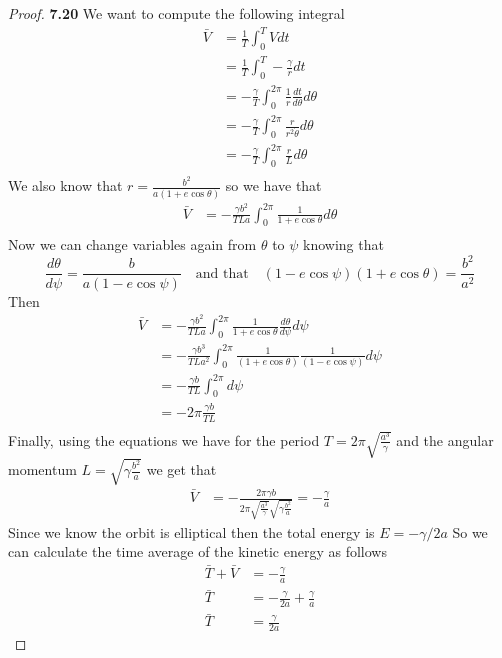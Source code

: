 \documentclass[11pt]{article}
\theoremstyle{definition}
\begin{document}
	\begin{proof}{\textbf{7.20}}
        We want to compute the following integral
        \begin{align*}
            \bar{V} &= \frac{1}{T}\int_0^T Vdt\\
                &= \frac{1}{T}\int_0^T -\frac{\gamma}{r}dt\\
                &= -\frac{\gamma}{T}\int_0^{2\pi} \frac{1}{r}\frac{dt}{d\theta}d\theta\\
                &= -\frac{\gamma}{T}\int_0^{2\pi} \frac{r}{r^2\dot{\theta}}d\theta\\
                &= -\frac{\gamma}{T}\int_0^{2\pi} \frac{r}{L}d\theta\\
        \end{align*}
        We also know that $r = \frac{b^2}{a(1+e\cos\theta)}$ so we have that
        \begin{align*}
            \bar{V} &= -\frac{\gamma b^2}{TLa}\int_0^{2\pi} \frac{1}{1 + e\cos\theta}d\theta\\
        \end{align*}
        Now we can change variables again from $\theta$ to $\psi$ knowing that
        $$\frac{d\theta}{d\psi} = \frac{b}{a(1-e\cos\psi)} \quad\text{and that}\quad
        (1-e\cos\psi)(1+e\cos\theta) = \frac{b^2}{a^2}$$
        Then
        \begin{align*}
            \bar{V} &= -\frac{\gamma b^2}{TLa}\int_0^{2\pi} \frac{1}{1 + e\cos\theta}
            \frac{d\theta}{d\psi} d\psi\\
                &= -\frac{\gamma b^3}{TLa^2}\int_0^{2\pi} \frac{1}{(1 + e\cos\theta)}
            \frac{1}{(1-e\cos\psi)} d\psi\\
                &= -\frac{\gamma b}{TL}\int_0^{2\pi}d\psi\\
                &= -2\pi\frac{\gamma b}{TL}\\
        \end{align*}
        Finally, using the equations we have for the period
        $T = 2\pi\sqrt{\frac{a^3}{\gamma}}$ and the angular momentum
        $L = \sqrt{\gamma \frac{b^2}{a}}$ we get that
        \begin{align*}
            \bar{V} &= -\frac{2\pi \gamma b}{2\pi \sqrt{\frac{a^3}{\gamma}}\sqrt{\gamma \frac{b^2}{a}}}
            = -\frac{\gamma}{a}
        \end{align*}
        Since we know the orbit is elliptical then the total energy is $E = -\gamma/2a$
        So we can calculate the time average of the kinetic energy as follows
        \begin{align*}
            \bar{T} + \bar{V} &= -\frac{\gamma}{a}\\
            \bar{T} &= -\frac{\gamma}{2a} + \frac{\gamma}{a}\\
            \bar{T} &= \frac{\gamma}{2a}
        \end{align*}
    \end{proof}
\end{document}
